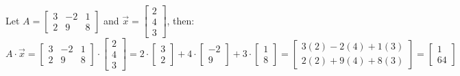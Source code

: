 \begin{eg}
    Let $A = \begin{bmatrix}3 & -2 & 1 \\ 2 & 9 & 8\end{bmatrix}$ and $\vec{x} = \begin{bmatrix} 2 \\ 4 \\ 3 \end{bmatrix}$, then:
    \[
        A \cdot \vec{x} = \begin{bmatrix}3 & -2 & 1 \\ 2 & 9 & 8\end{bmatrix} \cdot \begin{bmatrix} 2 \\ 4 \\ 3 \end{bmatrix} = 2 \cdot \begin{bmatrix} 3 \\ 2 \end{bmatrix} + 4 \cdot \begin{bmatrix} -2 \\ 9 \end{bmatrix} + 3 \cdot \begin{bmatrix} 1 \\ 8 \end{bmatrix} = \begin{bmatrix} 3(2) - 2(4) + 1(3) \\ 2(2) + 9(4) + 8(3) \end{bmatrix} = \begin{bmatrix} 1 \\ 64 \end{bmatrix}
    \]
\end{eg}

